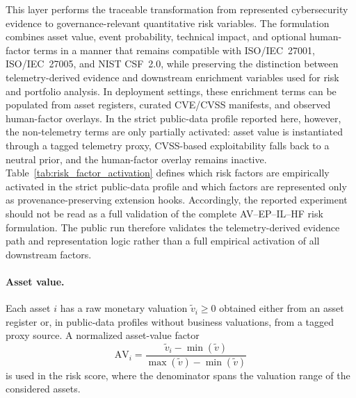 \documentclass[preprint,12pt]{elsarticle}
\begin{document}
This layer performs the traceable transformation from represented cybersecurity evidence to governance-relevant quantitative risk variables. The formulation combines asset value, event probability, technical impact, and optional human-factor terms in a manner that remains compatible with ISO/IEC~27001, ISO/IEC~27005, and NIST CSF~2.0, while preserving the distinction between telemetry-derived evidence and downstream enrichment variables used for risk and portfolio analysis. In deployment settings, these enrichment terms can be populated from asset registers, curated CVE/CVSS manifests, and observed human-factor overlays. In the strict public-data profile reported here, however, the non-telemetry terms are only partially activated: asset value is instantiated through a tagged telemetry proxy, CVSS-based exploitability falls back to a neutral prior, and the human-factor overlay remains inactive. Table~\ref{tab:risk_factor_activation} defines which risk factors are empirically activated in the strict public-data profile and which factors are represented only as provenance-preserving extension hooks. Accordingly, the reported experiment should not be read as a full validation of the complete AV--EP--IL--HF risk formulation. The public run therefore validates the telemetry-derived evidence path and representation logic rather than a full empirical activation of all downstream factors.

\paragraph{Asset value.}
Each asset $i$ has a raw monetary valuation $\tilde v_i \ge 0$ obtained either from an asset register or, in public-data profiles without business valuations, from a tagged proxy source. A normalized asset-value factor
\begin{equation}
  \mathrm{AV}_i =
    \frac{\tilde v_i - \min(\tilde v)}
         {\max(\tilde v) - \min(\tilde v)}
  \label{eq:av}
\end{equation}
is used in the risk score, where the denominator spans the valuation range of the considered assets.
\end{document}
